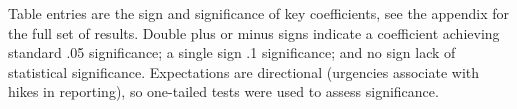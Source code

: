 \documentclass[letter,12pt]{article}
\begin{document}

Table entries are the sign and significance of key coefficients, see the appendix for the full set of results. Double plus or minus signs indicate a coefficient achieving standard .05 significance; a single sign .1 significance; and no sign lack of statistical significance. Expectations are directional (urgencies associate with hikes in reporting), so one-tailed tests were used to assess significance. 

% 
% 
% 
% 
% 
\end{document}
